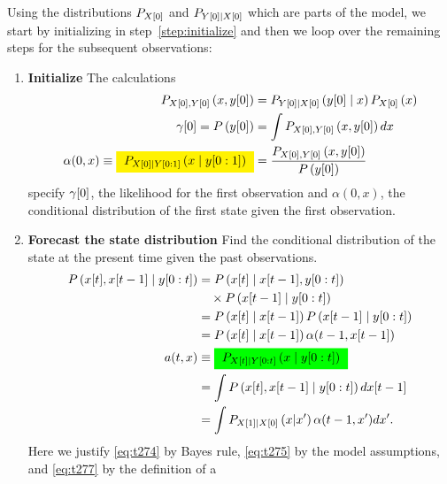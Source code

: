 Using the distributions $P_{{X}{[0]}}$ and
$P_{{Y}{[0]}\mid {X}{[0]}}$ which are parts of the model, we start
by initializing in step~\ref{step:initialize} and then we loop over
the remaining steps for the subsequent observations:
\begin{enumerate}
\item \textbf{Initialize} \label{step:initialize} The calculations
\begin{align}
  \label{eq:ContInitial}
  P_{\ti{X}{0},\ti{Y}{0}} \left(x,\ti{y}{0} \right) &=
  P_{\ti{Y}{0}\given \ti{X}{0}} \left(\ti{y}{0}\given x \right)P_{\ti{X}{0}}
  \left(x \right) \\
  \ti{\gamma}{0} = P\left(\ti{y}{0} \right) & = \int
  P_{\ti{X}{0},\ti{Y}{0}}
  \left(x,\ti{y}{0} \right) dx \\
  \alpha(0,x) \equiv \alphax{X}{0}{1}{x} &=
  \frac{P_{\ti{X}{0},\ti{Y}{0}} \left(x,\ti{y}{0}
    \right)}{P\left(\ti{y}{0} \right)}
\end{align}
specify ${\gamma}{[0]}$, the likelihood for the first observation and
$\alpha(0,x)$, the conditional distribution of the first state given
the first observation.
\item \textbf{Forecast the state distribution}  Find
  the conditional distribution of the state at the present time given
  the past observations.
\begin{align}
  \label{eq:t274}
  P\left(\ti{x}{t},\ti{x}{t-1}\given \ts{y}{0}{t} \right)
  &= P\left(\ti{x}{t}\given \ti{x}{t-1},\ts{y}{0}{t} \right) \\
  \nonumber
  &\quad \times P\left(\ti{x}{t-1}\given \ts{y}{0}{t} \right) \\
  \label{eq:t275}
  &= P\left(\ti{x}{t}\given \ti{x}{t-1} \right)
    P\left(\ti{x}{t-1}\given \ts{y}{0}{t} \right) \\
  \nonumber
  &= P\left(\ti{x}{t}\given \ti{x}{t-1} \right)
    \alpha(t-1,\ti{x}{t-1})\\
  \nonumber
  a(t,x) &\equiv \StateForecast{X}{x}{t} \\
  \label{eq:t277}
  &= \int P\left(\ti{x}{t},\ti{x}{t-1}\given \ts{y}{0}{t} \right)
    d\ti{x}{t-1}\\
  \label{eq:FIForecast}
  &= \int P_{\ti{X}{1} \given \ti{X}{0}} \left(x|x' \right)
    \alpha(t-1,x') dx'.
\end{align}
Here we justify \eqref{eq:t274} by Bayes rule, \eqref{eq:t275} by
the model assumptions, and \eqref{eq:t277} by the definition of a

\end{enumerate}
